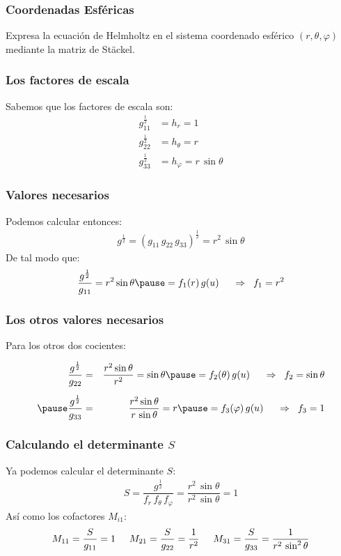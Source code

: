 \documentclass[12pt]{beamer}
\begin{document}
\begin{frame}
\frametitle{Coordenadas Esféricas}
Expresa la ecuación de Helmholtz en el sistema coordenado esférico $(r, \theta, \varphi)$ mediante la matriz de Stäckel.
\end{frame}
\begin{frame}
\frametitle{Los factores de escala}
Sabemos que los factores de escala son:
\begin{align*}
g_{11}^{\frac{1}{2}} &= h_{r} = 1 \\[0.5em] 
g_{22}^{\frac{1}{2}} &= h_{\theta} = r \\[0.5em] 
g_{33}^{\frac{1}{2}} &= h_{\varphi} = r \, \sin \theta
\end{align*}
\end{frame}
\begin{frame}
\frametitle{Valores necesarios}
Podemos calcular entonces:
\pause
\begin{align*}
g^{\frac{1}{2}} = (g_{11} \, g_{22} \, g_{33})^{\frac{1}{2}} = r^{2} \, \sin \theta
\end{align*}
\pause
De tal modo que:
\begin{eqnarray*}
\dfrac{g^{\frac{1}{2}}}{g_{11}} = r^{2} \sin \theta \pause = f_{1}(r) \, g(u) \hspace{0.5cm} \Rightarrow \hspace{0.2cm} f_{1} = r^{2}
\end{eqnarray*}
\end{frame}
\begin{frame}
\frametitle{Los otros valores necesarios}
Para los otros dos cocientes:

\begin{eqnarray*}
\dfrac{g^{\frac{1}{2}}}{g_{22}} &=& \dfrac{r^{2} \sin \theta}{r^{2}} = \sin \theta \pause = f_{2}(\theta) \, g(u) \hspace{0.5cm} \Rightarrow \hspace{0.2cm} f_{2} = \sin \theta \\[0.5em] \pause
\dfrac{g^{\frac{1}{2}}}{g_{33}} &=& \dfrac{r^{2} \sin \theta}{r \, \sin \theta} = r \pause = f_{3}(\varphi) \, g(u) \hspace{0.5cm} \Rightarrow \hspace{0.2cm} f_{3} = 1
\end{eqnarray*}
\end{frame}
\begin{frame}
\frametitle{Calculando el determinante $S$}
Ya podemos calcular el determinante $S$:
\pause
\begin{align*}
S = \dfrac{g^{\frac{1}{2}}}{f_{r} \, f_{\theta} \, f_{\varphi}} = \dfrac{r^{2} \, \sin \theta}{r^{2} \, \sin \theta} = 1
\end{align*}
\pause
Así como los cofactores $M_{i1}$:
\pause
\begin{align*}
M_{11} = \dfrac{S}{g_{11}} = 1 \hspace{0.5cm} M_{21} = \dfrac{S}{g_{22}} = \dfrac{1}{r^{2}} \hspace{0.5cm} M_{31} = \dfrac{S}{g_{33}} = \dfrac{1}{r^{2} \, \sin^{2} \theta}
\end{align*}
\end{frame}
\end{document}
